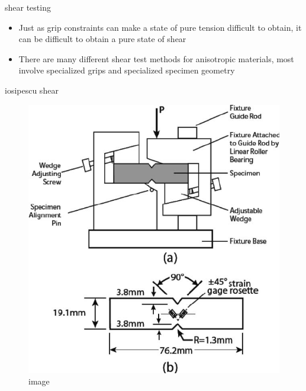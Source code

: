 \documentclass[
  letterpaper,
  ignorenonframetext,
  aspectratio=43,
  handout,
  12pt]{beamer}
\providecommand{\tightlist}{%
  \setlength{\itemsep}{0pt}\setlength{\parskip}{0pt}}
\providecommand{\tightlist}{%
\setlength{\itemsep}{0pt}\setlength{\parskip}{0pt}}
\let\Oldincludegraphics\includegraphics
\renewcommand{\includegraphics}[2][]{\Oldincludegraphics[width=\textwidth,height=0.7\textheight,keepaspectratio]{#2}}
\begin{document}
\begin{frame}{shear testing}
\protect\hypertarget{shear-testing}{}
\begin{itemize}
\tightlist
\item
  Just as grip constraints can make a state of pure tension difficult to
  obtain, it can be difficult to obtain a pure state of shear
\item
  There are many different shear test methods for anisotropic materials,
  most involve specialized grips and specialized specimen geometry
\end{itemize}
\end{frame}

\begin{frame}{iosipescu shear}
\protect\hypertarget{iosipescu-shear}{}
\begin{figure}
\centering
\includegraphics{../images/iosipescu.png}
\caption{image}
\end{figure}
\end{frame}
\end{document}
